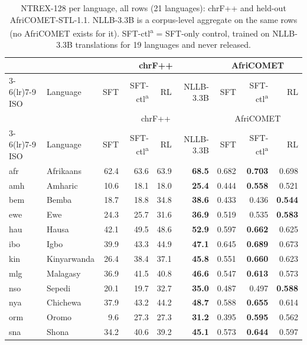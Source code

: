 {\scriptsize\setlength{\tabcolsep}{2pt}\renewcommand{\arraystretch}{0.95}
\begin{longtable}{@{}llrrrrrrr@{}}
\caption{NTREX-128 per language, all rows (21 languages): chrF++ and held-out AfriCOMET-STL-1.1. NLLB-3.3B is a corpus-level aggregate on the same rows (no AfriCOMET exists for it). SFT-ctl\textsuperscript{a} = SFT-only control, trained on NLLB-3.3B translations for 19 languages and never released.}\label{tab:fr-nt-merged}\\
\toprule
& & \multicolumn{4}{c}{chrF++} & \multicolumn{3}{c}{AfriCOMET} \\
\cmidrule(lr){3-6}\cmidrule(lr){7-9}
ISO & Language & SFT & SFT-ctl\textsuperscript{a} & RL & NLLB-3.3B & SFT & SFT-ctl\textsuperscript{a} & RL \\
\midrule\endfirsthead
\toprule
& & \multicolumn{4}{c}{chrF++} & \multicolumn{3}{c}{AfriCOMET} \\
\cmidrule(lr){3-6}\cmidrule(lr){7-9}
ISO & Language & SFT & SFT-ctl\textsuperscript{a} & RL & NLLB-3.3B & SFT & SFT-ctl\textsuperscript{a} & RL \\
\midrule\endhead
\midrule\endfoot
\bottomrule\endlastfoot
afr & Afrikaans & 62.4 & 63.6 & 63.9 & \textbf{68.5} & 0.682 & \textbf{0.703} & 0.698 \\
amh & Amharic & 10.6 & 18.1 & 18.0 & \textbf{25.4} & 0.444 & \textbf{0.558} & 0.521 \\
bem & Bemba & 18.7 & 18.8 & 34.8 & \textbf{38.6} & 0.433 & 0.436 & \textbf{0.544} \\
ewe & Ewe & 24.3 & 25.7 & 31.6 & \textbf{36.9} & 0.519 & 0.535 & \textbf{0.583} \\
hau & Hausa & 42.1 & 49.5 & 48.6 & \textbf{52.9} & 0.597 & \textbf{0.662} & 0.625 \\
ibo & Igbo & 39.9 & 43.3 & 44.9 & \textbf{47.1} & 0.645 & \textbf{0.689} & 0.673 \\
kin & Kinyarwanda & 26.4 & 38.4 & 37.1 & \textbf{45.8} & 0.551 & \textbf{0.660} & 0.623 \\
mlg & Malagasy & 36.9 & 41.5 & 40.8 & \textbf{46.6} & 0.547 & \textbf{0.613} & 0.573 \\
nso & Sepedi & 20.1 & 19.7 & 32.7 & \textbf{35.0} & 0.487 & 0.497 & \textbf{0.588} \\
nya & Chichewa & 37.9 & 43.2 & 44.2 & \textbf{48.7} & 0.588 & \textbf{0.655} & 0.614 \\
orm & Oromo & 9.6 & 27.3 & 27.3 & \textbf{31.2} & 0.395 & \textbf{0.595} & 0.562 \\
sna & Shona & 34.2 & 40.6 & 39.2 & \textbf{45.1} & 0.573 & \textbf{0.644} & 0.597 \\

\end{longtable}}
